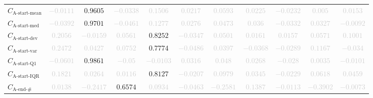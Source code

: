 \documentclass{standalone}
\newcommand{\startmeanname}{\text{A-start-mean}}
\newcommand{\startmean}{C_{\startmeanname}}
\newcommand{\startmedianname}{\text{A-start-med}}
\newcommand{\startmedian}{C_{\startmedianname}}
\newcommand{\startdevname}{\text{A-start-dev}}
\newcommand{\startdev}{C_{\startdevname}}
\newcommand{\startvarname}{\text{A-start-var}}
\newcommand{\startvar}{C_{\startvarname}}
\newcommand{\startqonename}{\text{A-start-Q1}}
\newcommand{\startqone}{C_{\startqonename}}
\newcommand{\startiqrname}{\text{A-start-IQR}}
\newcommand{\startiqr}{C_{\startiqrname}}
\newcommand{\lastactivitiesname}{\text{A-end-\#}}
\newcommand{\lastactivities}{C_{\lastactivitiesname}}
\begin{document}
\begin{tabular}{lcccccccccc}
$\startmean$ & \textcolor{lightgray}{$-0.0111$} & $0.9605$ & \textcolor{lightgray}{$-0.0338$} & \textcolor{lightgray}{$0.1506$} & \textcolor{lightgray}{$0.0217$} & \textcolor{lightgray}{$0.0593$} & \textcolor{lightgray}{$0.0225$} & \textcolor{lightgray}{$-0.0232$} & \textcolor{lightgray}{$0.005$} & \textcolor{lightgray}{$0.0153$} \\ 
$\startmedian$ & \textcolor{lightgray}{$-0.0392$} & $0.9701$ & \textcolor{lightgray}{$-0.0461$} & \textcolor{lightgray}{$0.1277$} & \textcolor{lightgray}{$0.0276$} & \textcolor{lightgray}{$0.0473$} & \textcolor{lightgray}{$0.036$} & \textcolor{lightgray}{$-0.0332$} & \textcolor{lightgray}{$0.0327$} & \textcolor{lightgray}{$-0.0092$} \\ 
$\startdev$ & \textcolor{lightgray}{$0.2056$} & \textcolor{lightgray}{$-0.0159$} & \textcolor{lightgray}{$0.0561$} & $0.8252$ & \textcolor{lightgray}{$-0.0347$} & \textcolor{lightgray}{$0.0501$} & \textcolor{lightgray}{$0.0161$} & \textcolor{lightgray}{$0.0157$} & \textcolor{lightgray}{$0.0571$} & \textcolor{lightgray}{$0.1001$} \\ 
$\startvar$ & \textcolor{lightgray}{$0.2472$} & \textcolor{lightgray}{$0.0427$} & \textcolor{lightgray}{$0.0752$} & $0.7774$ & \textcolor{lightgray}{$-0.0486$} & \textcolor{lightgray}{$0.0397$} & \textcolor{lightgray}{$-0.0368$} & \textcolor{lightgray}{$-0.0289$} & \textcolor{lightgray}{$0.1167$} & \textcolor{lightgray}{$-0.034$} \\ 
$\startqone$ & \textcolor{lightgray}{$-0.0601$} & $0.9861$ & \textcolor{lightgray}{$-0.05$} & \textcolor{lightgray}{$-0.0103$} & \textcolor{lightgray}{$0.0316$} & \textcolor{lightgray}{$0.048$} & \textcolor{lightgray}{$0.0268$} & \textcolor{lightgray}{$-0.028$} & \textcolor{lightgray}{$0.0035$} & \textcolor{lightgray}{$-0.0101$} \\ 
$\startiqr$ & \textcolor{lightgray}{$0.1821$} & \textcolor{lightgray}{$0.0264$} & \textcolor{lightgray}{$0.0116$} & $0.8127$ & \textcolor{lightgray}{$-0.0207$} & \textcolor{lightgray}{$0.0979$} & \textcolor{lightgray}{$0.0345$} & \textcolor{lightgray}{$-0.0229$} & \textcolor{lightgray}{$0.0618$} & \textcolor{lightgray}{$0.0459$} \\ 
$\lastactivities$ & \textcolor{lightgray}{$0.0138$} & \textcolor{lightgray}{$-0.2417$} & $0.6574$ & \textcolor{lightgray}{$0.0934$} & \textcolor{lightgray}{$-0.0463$} & \textcolor{lightgray}{$-0.2581$} & \textcolor{lightgray}{$0.1387$} & \textcolor{lightgray}{$-0.0113$} & \textcolor{lightgray}{$-0.3902$} & \textcolor{lightgray}{$-0.0073$} \\ 

\end{tabular}
\end{document}
